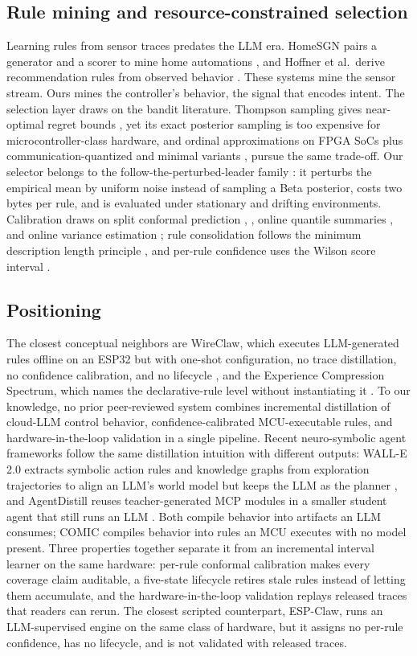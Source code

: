 \documentclass[review]{elsarticle}
\begin{document}
\subsection{Rule mining and resource-constrained selection}

Learning rules from sensor traces predates the LLM era. HomeSGN pairs a
generator and a scorer to mine home automations \cite{15}, and Hoffner et
al.\ derive recommendation rules from observed behavior \cite{16}. These
systems mine the sensor stream. Ours mines the controller's behavior, the
signal that encodes intent. The selection layer draws on the bandit
literature. Thompson sampling gives near-optimal regret bounds \cite{17}, yet
its exact posterior sampling is too expensive for microcontroller-class
hardware, and ordinal approximations on FPGA SoCs \cite{18} plus
communication-quantized and minimal variants \cite{19}, \cite{20} pursue the
same trade-off. Our selector
belongs to the follow-the-perturbed-leader family \cite{21}: it perturbs the
empirical mean by uniform noise instead of sampling a Beta posterior, costs
two bytes per rule, and is evaluated under stationary and drifting
environments. Calibration draws on split conformal prediction \cite{22},
\cite{23}, online quantile summaries \cite{24}, and online variance estimation
\cite{25}; rule consolidation follows the minimum description length principle
\cite{26}, and per-rule confidence uses the Wilson score interval \cite{27}.

\subsection{Positioning}

The closest conceptual neighbors are WireClaw, which executes LLM-generated
rules offline on an ESP32 but with one-shot configuration, no trace
distillation, no confidence calibration, and no lifecycle \cite{12}, and the
Experience Compression Spectrum, which names the declarative-rule level
without instantiating it \cite{11}. To our knowledge, no prior peer-reviewed
system combines incremental distillation of cloud-LLM control behavior,
confidence-calibrated MCU-executable rules, and hardware-in-the-loop
validation in a single pipeline. Recent neuro-symbolic agent frameworks follow the same
distillation intuition with different outputs: WALL-E 2.0 extracts symbolic
action rules and knowledge graphs from exploration trajectories to align an
LLM's world model but keeps the LLM as the planner \cite{37}, and AgentDistill
reuses teacher-generated MCP modules in a smaller student agent that still
runs an LLM \cite{38}. Both compile behavior into artifacts an LLM consumes;
COMIC compiles behavior into rules an MCU executes with no model present.
Three properties together separate it from an incremental
interval learner on the same hardware: per-rule conformal calibration makes
every coverage claim auditable, a five-state lifecycle retires stale rules
instead of letting them accumulate, and the hardware-in-the-loop validation
replays released traces that readers can rerun. The closest scripted
counterpart, ESP-Claw, runs an LLM-supervised engine on the same class of
hardware, but it assigns no per-rule confidence, has no lifecycle, and is not
validated with released traces.
\end{document}
